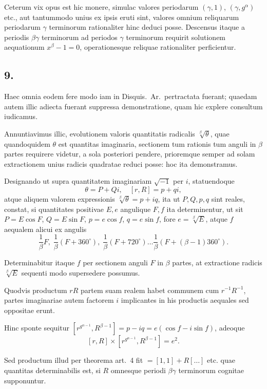 \documentclass[12pt,a4paper]{article}
\begin{document}
Ceterum vix opus est hic monere, simulac valores periodarum $(\gamma,1)$, $(\gamma,g^\alpha)$ etc., aut tantummodo unius ex ipsis eruti sint, valores omnium reliquarum periodarum $\gamma$ terminorum rationaliter hinc deduci posse. Descensus itaque a periodis $\beta\gamma$ terminorum ad periodos $\gamma$ terminorum requirit solutionem aequationum $x^\beta-1=0$, operationesque reliquae rationaliter perficientur.

\subsection*{9.}

Haec omnia eodem fere modo iam in Disquis.\ Ar.\ pertractata fuerant; quaedam autem illic adiecta fuerant suppressa demonstratione, quam hic explere consultum iudicamus.

Annuntiavimus illic, evolutionem valoris quantitatis radicalis $\sqrt[\beta]{\theta}$, quae quandoquidem $\theta$ est quantitas imaginaria, sectionem tum rationis tum anguli in $\beta$ partes requirere videtur, a sola posteriori pendere, prioremque semper ad solam extractionem unius radicis quadratae reduci posse: hoc ita demonstramus.

Designando ut supra quantitatem imaginariam $\sqrt{-1}$ per $i$, statuendoque
\[
\theta = P + Qi, \quad [r,R] = p + qi,
\]
atque aliquem valorem expressionis $\sqrt[\beta]{\theta} = p + iq$, ita ut $P,Q,p,q$ sint reales, constat, si quantitates positivae $E, e$ angulique $F, f$ ita determinentur, ut sit $P = E\cos F$, $Q = E\sin F$, $p = e\cos f$, $q = e\sin f$, fore $e = \sqrt[\beta]{E}$, atque $f$ aequalem alicui ex angulis
\[
\frac{1}{\beta}F,\; \frac{1}{\beta}(F+360^\circ),\; \frac{1}{\beta}(F+720^\circ)\ldots\frac{1}{\beta}(F+(\beta-1)360^\circ).
\]

Determinabitur itaque $f$ per sectionem anguli $F$ in $\beta$ partes, at extractione radicis $\sqrt[\beta]{E}$ sequenti modo supersedere possumus.

Quodvis productum $rR$ partem suam realem habet communem cum $r^{-1}R^{-1}$, partes imaginariae autem factorem $i$ implicantes in his productis aequales sed oppositae erunt.

Hinc sponte sequitur $[r^{g^{\alpha-1}}, R^{\beta-1}] = p - iq = e(\cos f - i\sin f)$, adeoque
\[
[r,R] \times [r^{g^{\alpha-1}}, R^{\beta-1}] = e^2.
\]

Sed productum illud per theorema art.\ 4 fit $= [1,1] + R[\ldots]$ etc. quae quantitas determinabilis est, si $R$ omnesque periodi $\beta\gamma$ terminorum cognitae supponuntur.
\end{document}
